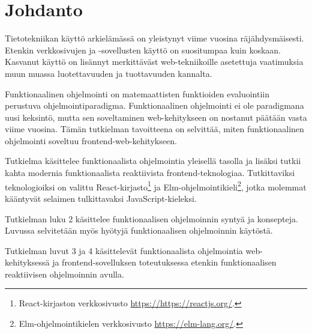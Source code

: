 \chapter{Johdanto} \label{Johdanto}
Tietotekniikan käyttö arkielämässä on yleistynyt viime vuosina räjähdysmäisesti. Etenkin verkkosivujen ja -sovellusten
käyttö on suositumpaa kuin koskaan. Kasvanut käyttö on lisännyt merkittäväst web-tekniikoille asetettuja vaatimuksia
muun muassa luotettavuuden ja tuottavuuden kannalta. 

Funktionaalinen ohjelmointi on matemaattisten funktioiden evaluointiin perustuva ohjelmointiparadigma. Funktionaalinen
ohjelmointi ei ole paradigmana uusi keksintö, mutta sen soveltaminen web-kehitykseen on nostanut päätään vasta viime
vuosina. Tämän tutkielman tavoitteena on selvittää, miten funktionaalinen ohjelmointi soveltuu frontend-web-kehitykseen.

Tutkielma käsittelee funktionaalista ohjelmointia yleisellä tasolla ja lisäksi tutkii kahta modernia funktionaalista
reaktiivista frontend-teknologiaa. Tutkittaviksi teknologioiksi on valittu
React-kirjasto\footnote{React-kirjaston verkkosivusto \url{https://https://reactjs.org/}.} ja
Elm-ohjelmointikieli\footnote{Elm-ohjelmointikielen verkkosivusto \url{https://elm-lang.org/}.}, jotka molemmat
kääntyvät selaimen tulkittavaksi JavaScript-kieleksi.

Tutkielman luku 2 käsittelee funktionaalisen ohjelmoinnin syntyä ja konsepteja. Luvussa selvitetään myös hyötyjä
funktionaalisen ohjelmoinnin käytöstä.

Tutkielman luvut 3 ja 4 käsittelevät funktionaalista ohjelmointia web-kehitykses\-sä ja frontend-sovelluksen toteutuksessa
etenkin funktionaalisen reaktiivisen ohjelmoinnin avulla.
